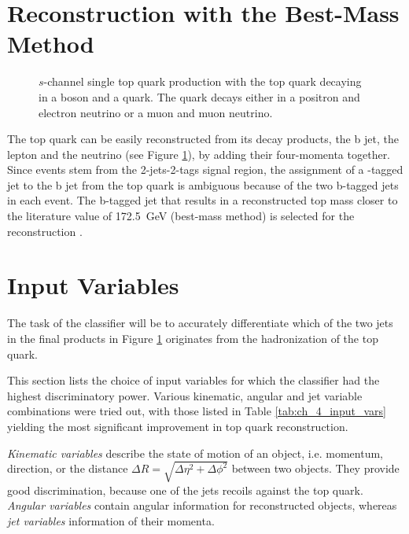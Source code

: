 \section{Reconstruction with the Best-Mass Method}
\label{sec:ch-4-best-mass}
\begin{figure}[h]
    \centering
    
    \caption{$s$-channel single top quark production with the top quark decaying in a \PWplus boson and a \Pbottom quark. The \PWplus quark decays either in a positron and electron neutrino or a muon and muon neutrino.}
    \label{fig:ch_4_single_top_reco}
\end{figure}
The top quark can be easily reconstructed from its decay products, the b jet, the lepton and the neutrino (see Figure \ref{fig:ch_4_single_top_reco}), by adding their four-momenta together. Since events stem from the 2-jets-2-tags signal region, the assignment of a \Pbottom-tagged jet to the b jet from the top quark is ambiguous because of the two b-tagged jets in each event. The b-tagged jet that results in a reconstructed top mass closer to the literature value of \SI{172.5}{GeV} (best-mass method) is selected for the reconstruction \cite{Fal18}.

\section{Input Variables}
\label{sec:ch-4-input-vars}
The task of the classifier will be to accurately differentiate which of the two \Pbottom jets in the final products in Figure \ref{fig:ch_4_single_top_reco} originates from the hadronization of the top quark.

This section lists the choice of input variables for which the classifier had the highest discriminatory power. Various kinematic, angular and jet variable combinations were tried out, with those listed in Table \ref{tab:ch_4_input_vars} yielding the most significant improvement in top quark reconstruction.

\emph{Kinematic variables} describe the state of motion of an object, i.e. momentum, direction, or the distance $\Delta R=\sqrt{\Delta \eta^2 + \Delta \phi^2}$ between two objects. They provide good discrimination, because one of the jets recoils against the top quark. \emph{Angular variables} contain angular information for reconstructed objects, whereas \emph{jet variables} information of their momenta.

